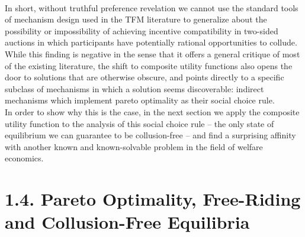 \documentclass[11pt,a4paper]{llncs}
\begin{document}
\vspace{0.2cm} \\
In short, without truthful preference revelation we cannot use the standard tools of mechanism design used in the TFM literature to generalize about the possibility or impossibility of achieving incentive compatibility in two-sided auctions in which participants have potentially rational opportunities to collude. While this finding is negative in the sense that it offers a general critique of most of the existing literature, the shift to composite utility functions also opens the door to solutions that are otherwise obscure, and points directly to a specific subclass of mechanisms in which a solution seems discoverable: indirect mechanisms which implement pareto optimality as their social choice rule.
\vspace{0.2cm} \\
In order to show why this is the case, in the next section we apply the composite utility function to the analysis of this social choice rule -- the only state of equilibrium we can guarantee to be collusion-free -- and find a surprising affinity with another known and known-solvable problem in the field of welfare economics.





\section*{1.4. Pareto Optimality, Free-Riding and Collusion-Free Equilibria}
\end{document}
